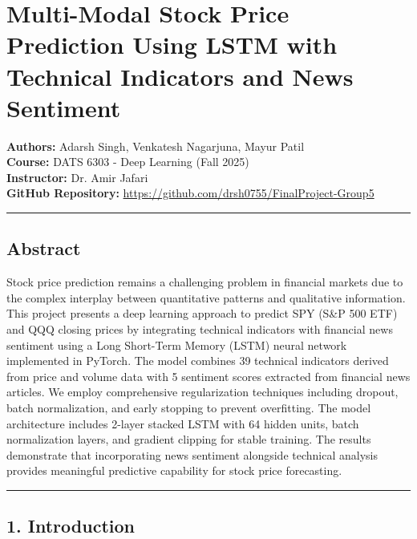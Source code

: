 \documentclass[
]{article}
\author{Venkatesh}
\date{December 7, 2025}
\begin{document}
\section{Multi-Modal Stock Price Prediction Using LSTM with Technical
Indicators and News
Sentiment}\label{multi-modal-stock-price-prediction-using-lstm-with-technical-indicators-and-news-sentiment}

\textbf{Authors:} Adarsh Singh, Venkatesh Nagarjuna, Mayur Patil\\
\textbf{Course:} DATS 6303 - Deep Learning (Fall 2025)\\
\textbf{Instructor:} Dr. Amir Jafari\\
\textbf{GitHub Repository:}
\url{https://github.com/drsh0755/FinalProject-Group5}

\begin{center}\rule{0.5\linewidth}{0.5pt}\end{center}

\subsection{Abstract}\label{abstract}

Stock price prediction remains a challenging problem in financial
markets due to the complex interplay between quantitative patterns and
qualitative information. This project presents a deep learning approach
to predict SPY (S\&P 500 ETF) and QQQ closing prices by integrating
technical indicators with financial news sentiment using a Long
Short-Term Memory (LSTM) neural network implemented in PyTorch. The
model combines 39 technical indicators derived from price and volume
data with 5 sentiment scores extracted from financial news articles. We
employ comprehensive regularization techniques including dropout, batch
normalization, and early stopping to prevent overfitting. The model
architecture includes 2-layer stacked LSTM with 64 hidden units, batch
normalization layers, and gradient clipping for stable training. The
results demonstrate that incorporating news sentiment alongside
technical analysis provides meaningful predictive capability for stock
price forecasting.

\begin{center}\rule{0.5\linewidth}{0.5pt}\end{center}

\subsection{1. Introduction}\label{1-introduction}
\end{document}
